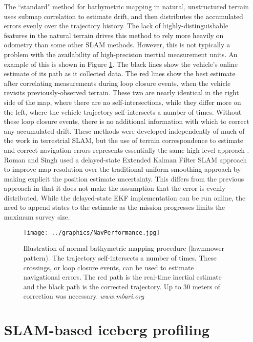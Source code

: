 The ``standard" method for bathymetric mapping in natural, unstructured terrain uses submap correlation to estimate drift, and then distributes the accumulated errors evenly over the trajectory history. The lack of highly-distinguishable features in the natural terrain drives this method to rely more heavily on odometry than some other SLAM methods. However, this is not typically a problem with the availability of high-precision inertial measurement units. An example of this is shown in Figure \ref{fig:BathyMapping}. The black lines show the vehicle's online estimate of its path as it collected data. The red lines show the best estimate after correlating measurements during loop closure events, when the vehicle revisits previously-observed terrain. These two are nearly identical in the right side of the map, where there are no self-intersections, while they differ more on the left, where the vehicle trajectory self-intersects a number of times. Without these loop closure events, there is no additional information with which to correct any accumulated drift. These methods were developed independently of much of the work in terrestrial SLAM, but the use of terrain correspondence to estimate and correct navigation errors represents essentially the same high level approach \cite{Henthorn2006}.  Roman and Singh used a delayed-state Extended Kalman Filter SLAM approach to improve map resolution over the traditional uniform smoothing approach by making explicit the position estimate uncertainty\cite{Roman2005}. This differs from the previous approach in that it does not make the assumption that the error is evenly distributed. While the delayed-state EKF implementation can be run online, the need to append states to the estimate as the mission progresses limits the maximum survey size.

 \begin{figure}[!htb]
   \centering
   \texttt{[image: ../graphics/NavPerformance.jpg]} %
   \caption{Illustration of normal bathymetric mapping procedure (lawnmower pattern). The trajectory self-intersects a number of times. These crossings, or loop closure events, can be used to estimate navigational errors. The red path is the real-time inertial estimate and the black path is the corrected trajectory. Up to 30 meters of correction was necessary. \emph{www.mbari.org} }
   \label{fig:BathyMapping}
\end{figure}


\section{SLAM-based iceberg profiling}

